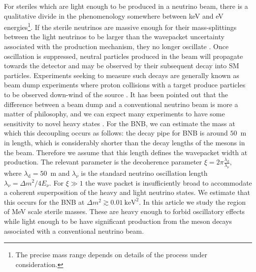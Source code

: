 \documentclass[11pt, a4paper]{article}
\def\ster{\ensuremath N}
\begin{document}
For steriles which are light enough to be produced in a neutrino beam,
%
%
there is a qualitative divide in the phenomenology somewhere between keV and eV
energies\footnote{The precise mass range depends on details of the process
under consideration.}. If the sterile neutrinos are massive enough for their
mass-splittings between the light neutrinos to be larger than the wavepacket
uncertainty associated with the production mechanism, they no longer oscillate
\cite{Akhmedov:2009rb}.  
%
Once oscillation is suppressed, neutral particles produced in the beam will
propagate towards the detector and may be observed by their subsequent decay
into SM particles. Experiments seeking to measure such decays are generally
known as beam dump experiments where proton collisions with a target produce
particles to be observed down-wind of the source \cite{CooperSarkar:1985nh,
Bergsma:1985is, Vaitaitis:1999wq, Bernardi:1985ny, Bernardi:1987ek,
Anelli:2015pba, Alekhin:2015byh}. It has been pointed out that the difference
between a beam dump and a conventional neutrino beam is more a matter of
philosophy, and we can expect many experiments to have some sensitivity to
novel heavy states \cite{Gorbunov:2007ak, Asaka:2012bb, Adams:2013qkq}. 
%
For the BNB, we can estimate the mass at which this decoupling occurs as
follows: the decay pipe for BNB is around $50$~m in length, which is
considerably shorter than the decay lengths of the mesons in the beam.
Therefore we assume that this length defines the wavepacket width at
production.  The relevant parameter is the decoherence parameter
\cite{Akhmedov:2009rb, Hernandez:2011rs}
%
$\xi = 2\pi \frac{\lambda_\text{d}}{\lambda_\nu},$
%
where $\lambda_\text{d} = 50$~m and $\lambda_\nu$ is the standard neutrino
oscillation length $\lambda_\nu = \Delta m^2/4E_\nu$. For $\xi\gg1$ the wave
packet is insufficiently broad to accommodate a coherent superposition of the
heavy and light neutrino states. We estimate that this occurs for the BNB at 
%
$ \Delta m^2 \gtrsim 0.01~\text{keV}^2.$
%
In this article we study the region of MeV scale sterile masses. These are
heavy enough to forbid oscillatory effects while light enough to be have
significant production from the meson decays associated with a conventional
neutrino beam. 
\end{document}
